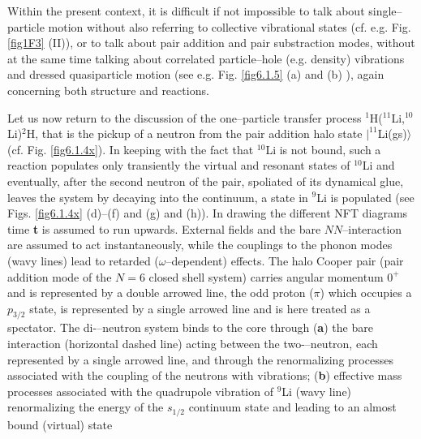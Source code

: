 Within the present context, it is difficult if not impossible to talk about single--particle motion without also referring to collective vibrational states (cf. e.g. Fig. \ref{fig1F3} (II)), or to talk about pair addition and pair substraction modes, without at the same time talking about correlated particle--hole (e.g. density) vibrations and dressed quasiparticle motion (see e.g. Fig. \ref{fig6.1.5} (a) and (b) ),  again concerning both  structure and reactions. 

 Let us now return to the discussion of the one--particle transfer process $^1$H($^{11}$Li,$^{10}$Li)$^2$H, that is the pickup of a neutron from the pair addition halo state $|^{11}$Li(gs)$\rangle$ (cf. Fig. \ref{fig6.1.4x}). In keeping with the fact that $^{10}$Li is not
bound, such a reaction populates only transiently the virtual and resonant states of $^{10}$Li and eventually, after the second neutron of the pair,
spoliated of its dynamical glue, leaves the system by decaying into the continuum, a state in $^{9}$Li is populated (see Figs. \ref{fig6.1.4x} (d)--(f) and  (g) and (h)). In drawing the different NFT diagrams
time \textbf{t} is assumed to run upwards. External fields and the bare $NN$--interaction are assumed to act instantaneously, while the couplings to the
phonon modes (wavy lines) lead to retarded ($\omega$--dependent) effects.  The halo Cooper pair (pair addition mode of the $N=6$
closed shell system) carries angular momentum $0^+$ and is represented by a double arrowed line, the odd proton ($\pi$) which occupies a $p_{3/2}$
state, is represented by a single arrowed line and is here treated as a spectator. The di-–neutron system binds to the core through (\textbf{a}) the bare interaction (horizontal
dashed line) acting between the two-–neutron, each represented by a single arrowed line, and through the renormalizing processes associated with the coupling of the neutrons with vibrations; (\textbf{b}) effective mass processes associated with the
quadrupole vibration of $^9$Li (wavy line) renormalizing the energy of the $s_{1/2}$ continuum state and leading to an almost bound (virtual) state
